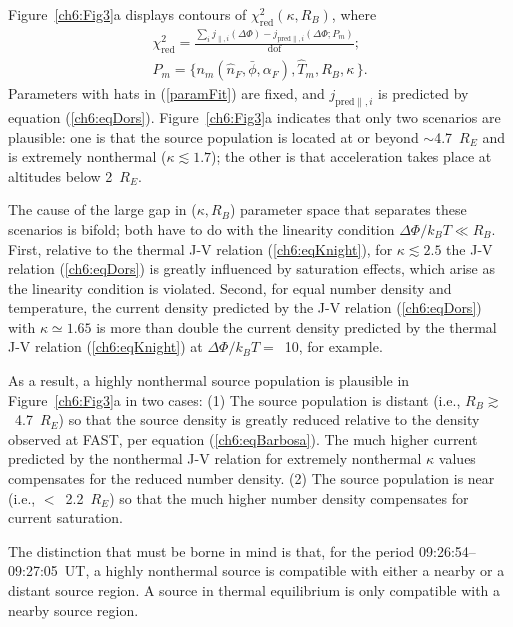   Figure~\ref{ch6:Fig3}a displays contours of $\chi^2_{\textrm{red}} (
  \kappa, R_B )$, where
  \begin{subequations}
    \begin{align} \chi^2_{\mathrm{red}} = \frac{\sum_i j_{\parallel,i} (\Delta \Phi) - j_{\textrm{pred}\parallel,i}(\Delta \Phi; P_m)}{\mathrm{dof}}; \\
      P_m = \Big \{ n_m ( \hat{n}_F, \bar{\phi} , \alpha_F ),
      \hat{T}_m, R_B, \kappa \, \Big \}. \label{paramFit}
    \end{align}
  \end{subequations}
  Parameters with hats in (\ref{paramFit}) are fixed, and
  $j_{\textrm{pred}\parallel,i} $ is predicted by equation
  (\ref{ch6:eqDors}). Figure~\ref{ch6:Fig3}a indicates that only two scenarios
  are plausible: one is that the source population is located at or
  beyond $\sim$4.7~$R_E$ and is extremely nonthermal ($\kappa \lesssim
  1.7$); the other is that acceleration takes place at altitudes below
  2~$R_E$. 

  The cause of the large gap in ($\kappa, R_B$) parameter space that
  separates these scenarios is bifold; both have to do with the
  linearity condition $\Delta \Phi / k_B T \ll R_B $. First, relative
  to the thermal J-V relation (\ref{ch6:eqKnight}), for $\kappa
  \lesssim 2.5$ the J-V relation (\ref{ch6:eqDors}) is greatly
  influenced by saturation effects, which arise as the linearity
  condition is violated. Second, for equal number density and
  temperature, the current density predicted by the J-V relation
  (\ref{ch6:eqDors}) with $\kappa \simeq 1.65$ is more than double the
  current density predicted by the thermal J-V relation
  (\ref{ch6:eqKnight}) at $\Delta \Phi / k_B T =$~10, for example.

  As a result, a highly nonthermal source population is plausible in
  Figure~\ref{ch6:Fig3}a in two cases: (1) The source population is
  distant (i.e., $R_B \gtrsim$~4.7~$R_E$) so that the source density
  is greatly reduced relative to the density observed at FAST, per
  equation (\ref{ch6:eqBarbosa}). The much higher current predicted by the
  nonthermal J-V relation for extremely nonthermal $\kappa$ values
  compensates for the reduced number density. (2) The source
  population is near (i.e., $<$~2.2~$R_E$) so that the much higher
  number density compensates for current saturation.

  The distinction that must be borne in mind is that, for the period
  09:26:54--09:27:05~UT, a highly nonthermal source is compatible with
  either a nearby or a distant source region. A source in thermal
  equilibrium is only compatible with a nearby source region.

